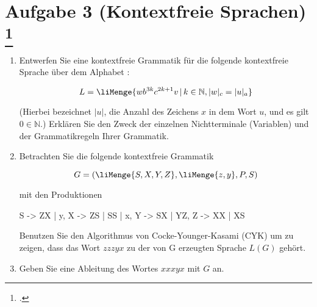 \documentclass{lehramt-informatik-aufgabe}
\begin{document}
\let\m=\liMenge

\liAufgabenTitel{}
\section{Aufgabe 3 (Kontextfreie Sprachen)
\footcite{66115:2018:09}}

\begin{enumerate}


\item Entwerfen Sie eine kontextfreie Grammatik für die folgende
kontextfreie Sprache über dem Alphabet :

\begin{displaymath}
L=\m{ w b^{3k} c^{2k+1} v \, | \, k \in \mathbb{N}, |w|_c= |u|_a}
\end{displaymath}

(Hierbei bezeichnet $|u|$, die Anzahl des Zeichens $x$ in dem Wort $u$,
und es gilt $0 \in \mathbb{N}$.) Erklären Sie den Zweck der einzelnen
Nichtterminale (Variablen) und der Grammatikregeln Ihrer Grammatik.


\item Betrachten Sie die folgende kontextfreie Grammatik

\begin{displaymath}
G = (\m{S, X,Y, Z}, \m{z, y}, P, S)
\end{displaymath}

mit den Produktionen

\begin{liProduktionsRegeln}
S -> ZX | y,
X -> ZS | SS | x,
Y -> SX | YZ,
Z -> XX | XS
\end{liProduktionsRegeln}

Benutzen Sie den Algorithmus von Cocke-Younger-Kasami (CYK) um zu
zeigen, dass das Wort $zzzyx$ zu der von G erzeugten Sprache $L(G)$
gehört.


\item Geben Sie eine Ableitung des Wortes $xxxyx$ mit $G$ an.

\end{enumerate}
\end{document}
